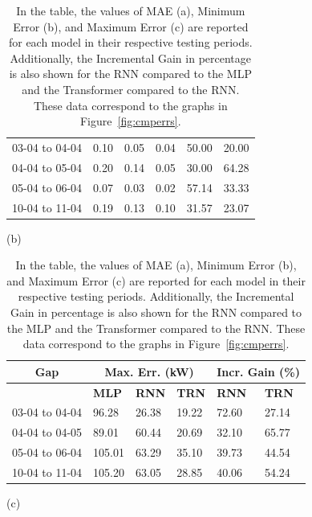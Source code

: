 \begin{table}[H]
\begin{subfigure}{\textwidth}
\begin{tabular}{l|l|l|l|l|l}
			\cline{2-6}
			03-04 to 04-04                    & 0.10                                         & 0.05         & 0.04         & 50.00        & 20.00        \\
			04-04 to 05-04                    & 0.20                                         & 0.14         & 0.05         & 30.00        & 64.28        \\
			05-04 to 06-04                    & 0.07                                         & 0.03         & 0.02         & 57.14        & 33.33        \\
			10-04 to 11-04                    & 0.19                                         & 0.13         & 0.10         & 31.57        & 23.07
		\end{tabular}
		\caption*{(b)}
	\end{subfigure}
	\begin{subfigure}{\textwidth}
		\centering
		\begin{tabular}{l|l|l|l|l|l}
			\multicolumn{1}{c|}{\textbf{Gap}} & \multicolumn{3}{c|}{\textbf{Max. Err. (kW)}}
			                                  & \multicolumn{2}{c}{\textbf{Incr. Gain (\%)}}                                                             \\
			\hline
			                                  & \textbf{MLP}                                 & \textbf{RNN} & \textbf{TRN} & \textbf{RNN} & \textbf{TRN} \\
			\cline{2-6}
			03-04 to 04-04                    & 96.28                                        & 26.38        & 19.22        & 72.60        & 27.14        \\
			04-04 to 04-05                    & 89.01                                        & 60.44        & 20.69        & 32.10        & 65.77        \\
			05-04 to 06-04                    & 105.01                                       & 63.29        & 35.10        & 39.73        & 44.54        \\
			10-04 to 11-04                    & 105.20                                       & 63.05        & 28.85        & 40.06        & 54.24
		\end{tabular}
		\caption*{(c)}
	\end{subfigure}
	\caption{In the table, the values of MAE (a), Minimum Error (b), and Maximum Error (c) are reported for each model in their respective testing periods. Additionally, the Incremental Gain in percentage is also shown for the RNN compared to the MLP and the Transformer compared to the RNN. These data correspond to the graphs in Figure~\ref{fig:cmperrs}.}
	\label{tab:cmperrtab}
\end{table}

